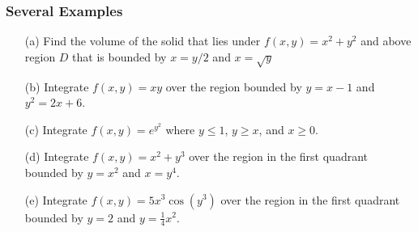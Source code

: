 \documentclass{beamer}
\begin{document}
\begin{frame}
\frametitle{\textbf{Several Examples}}

\begin{itemize}
	\item[(a)] Find the volume of the solid that lies under $f(x,y) = x^2+y^2$ and above region $D$ that is bounded by $x=y/2$ and $x=\sqrt{y}$
	\item[(b)] Integrate $f(x,y)=xy$ over the region bounded by $y=x-1$ and $y^2=2x+6$.
	\item[(c)] Integrate $f(x,y) = e^{y^2}$ where $y\leq1$, $y\geq x$, and $x\geq0$.
	\item[(d)] Integrate $f(x,y)=x^2+y^3$ over the region in the first quadrant bounded by $y=x^2$ and $x=y^4$.
	\item[(e)] Integrate $f(x,y) = 5x^3 \cos(y^3)$ over the region in the first quadrant bounded by $y=2$ and $y=\frac{1}{4}x^2$.
\end{itemize}
\end{frame}
\end{document}
